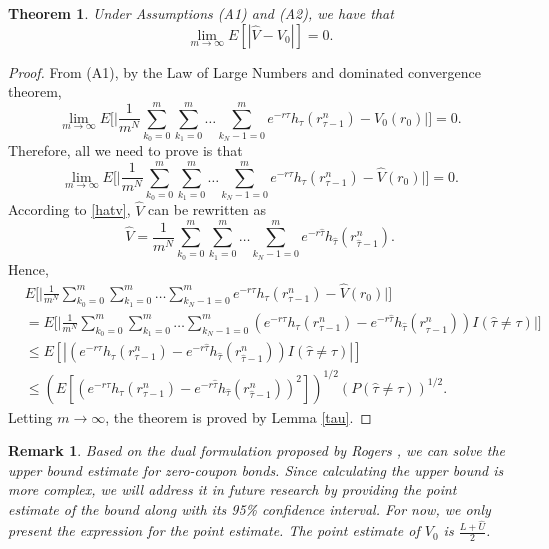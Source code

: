 \documentclass[10pt,a4paper]{amsart}
\numberwithin{equation}{section}
\newtheorem{theorem}[theo]{Theorem}
\newtheorem{remark}[theo]{Remark}
\begin{document}
\begin{theorem}
 Under Assumptions {\rm (A1)} and {\rm (A2)}, we have that
\[
 \lim _{m \to \infty} E\left[\left|\hat{V}-V_0\right|\right]=0 .
\]
\end{theorem}

\begin{proof}
From (A1), by the Law of Large Numbers and dominated convergence theorem,
\[
 \lim _{m \to \infty} E\Big[\Big| \frac{1}{m^N} 
 \sum_{k_0=0}^m \sum_{k_1=0}^m \dots \sum_{k_N-1=0}^m 
 e^{-r \tau} h_{\tau}\left(r_{\tau-1}^n\right) - V_0\left(r_0 \right) \Big|\Big]=0 .
\]
Therefore, all we need to prove is that
\[
 \lim _{m \to \infty} E\Big[\Big| \frac{1}{m^N} \sum_{k_0=0}^m \sum_{k_1=0}^m 
 \dots \sum_{k_N-1=0}^m e^{-r \tau} h_{\tau}\left(r_{\tau-1}^n\right) 
 - \hat{V}\left(r_0 \right) \Big|\Big]=0 .
\]
According to \eqref{hatv}, $\hat{V}$ can be rewritten as
\[
 \hat{V}=\frac{1}{m^N} \sum_{k_0=0}^m \sum_{k_1=0}^m \dots 
 \sum_{k_N-1=0}^m e^{-r \hat{\tau}} h_{\hat{\tau}}\left(r_{\hat{\tau}-1}^n\right).
\]
Hence,
\begin{align*}
& E\Big[\Big| \frac{1}{m^N} \sum_{k_0=0}^m \sum_{k_1=0}^m \dots 
 \sum_{k_N-1=0}^m e^{-r \tau} h_{\tau}\left(r_{\tau-1}^n\right) 
 - \hat{V}\left(r_0 \right)\Big|\Big] \\
&= E\Big[\Big| \frac{1}{m^N} \sum_{k_0=0}^m \sum_{k_1=0}^m \dots 
 \sum_{k_N-1=0}^m \left(e^{-r \tau} h_{\tau}\left(r_{\tau-1}^n\right)
  -e^{-r \hat{\tau}} h_{\hat{\tau}}\left(r_{\hat{\tau}-1}^n\right)\right) 
  I\left(\hat{\tau} \neq \tau\right)\Big|\Big] \\
&\leq  E\left[\left|\left(e^{-r \tau} h_{\tau}\left(r_{\tau-1}^n\right)
 -e^{-r \hat{\tau}} h_{\hat{\tau}}\left(r_{\hat{\tau}-1}^n\right)\right) 
  I\left(\hat{\tau} \neq \tau\right)\right|\right] \\
&\leq \left(E\left[\left(e^{-r \tau} h_{\tau}\left(r_{\tau-1}^n\right)
 -e^{-r \hat{\tau}} h_{\hat{\tau}}\left(r_{\hat{\tau}-1}^n\right)
  \right)^2\right]\right)^{1 / 2}\left(P\left(\hat{\tau} 
  \neq \tau\right)\right)^{1 / 2} .
\end{align*}
Letting $m \to \infty$, the theorem is proved by Lemma \ref{tau}.
\end{proof}

\begin{remark} \rm
Based on the dual formulation proposed by Rogers \cite{rogers2002monte}, we can 
solve the upper bound estimate for zero-coupon bonds.
Since calculating the upper bound is more complex, we will address it in future 
research by providing the point estimate of the bound along with its 95\% confidence 
interval. For now, we only present the expression for the point estimate.
 The point estimate of $V_0$ is
$ \frac{\hat{L}+\hat{U}}{2}$.
\end{remark}
\end{document}
